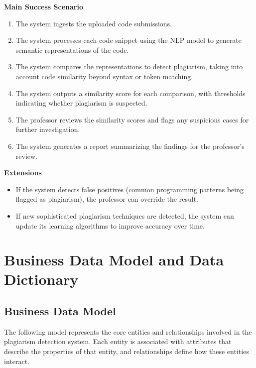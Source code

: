 \documentclass[12pt]{article}
\begin{document}
\textbf{Main Success Scenario}
\begin{enumerate}
    \item The system ingests the uploaded code submissions.
    \item The system processes each code snippet using the NLP model to generate semantic representations of the code.
    \item The system compares the representations to detect plagiarism, taking into account code similarity beyond syntax or token matching.
    \item The system outputs a similarity score for each comparison, with thresholds indicating whether plagiarism is suspected.
    \item The professor reviews the similarity scores and flags any suspicious cases for further investigation.
    \item The system generates a report summarizing the findings for the professor’s review.
\end{enumerate}

\textbf{Extensions}
\begin{itemize}
    \item If the system detects false positives (common programming patterns being flagged as plagiarism), the professor can override the result.
    \item If new sophisticated plagiarism techniques are detected, the system can update its learning algorithms to improve accuracy over time.
\end{itemize}

\section{Business Data Model and Data Dictionary}
\subsection{Business Data Model}

The following model represents the core entities and relationships involved in the plagiarism detection system. Each entity is associated with attributes that describe the properties of that entity, and relationships define how these entities interact.
\end{document}

